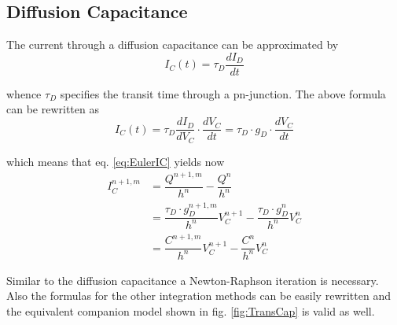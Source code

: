 \subsection{Diffusion Capacitance}

The current through a diffusion capacitance can be approximated by
\begin{equation}
I_C(t) = \tau_D \dfrac{d I_D}{d t}
\end{equation}

whence $\tau_D$ specifies the transit time through a pn-junction.  The
above formula can be rewritten as
\begin{equation}
I_C(t) = \tau_D \dfrac{d I_D}{d V_C}\cdot \dfrac{d V_C}{d t} = \tau_D \cdot g_D \cdot \dfrac{d V_C}{d t}
\end{equation}

which means that eq. \eqref{eq:EulerIC} yields now
\begin{equation}
\begin{split}
I_C^{n+1,m} &= \dfrac{Q^{n+1,m}}{h^{n}} - \dfrac{Q^{n}}{h^{n}}\\
&= \dfrac{\tau_D\cdot g_D^{n+1,m}}{h^{n}} V_C^{n+1} - \dfrac{\tau_D\cdot g_D^{n}}{h^{n}} V_C^{n}\\
&= \dfrac{C^{n+1,m}}{h^{n}} V_C^{n+1} - \dfrac{C^{n}}{h^{n}} V_C^{n}
\end{split}
\end{equation}

Similar to the diffusion capacitance a Newton-Raphson iteration is
necessary.  Also the formulas for the other integration methods can be
easily rewritten and the equivalent companion model shown in
fig. \ref{fig:TransCap} is valid as well.
